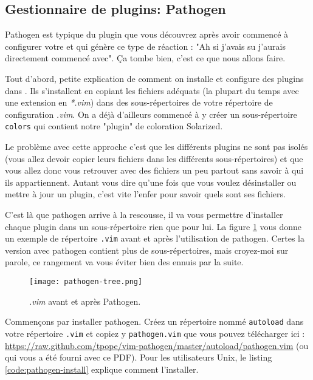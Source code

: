 \subsection{Gestionnaire de plugins: Pathogen}

Pathogen est typique du plugin que vous découvrez après avoir commencé à configurer votre \vim et qui génère ce type de réaction : "Ah si j'avais su j'aurais directement commencé avec". Ça tombe bien, c'est ce que nous allons faire.

Tout d'abord, petite explication de comment on installe et configure des plugins dans \vim. Ils s'installent en copiant les fichiers adéquats (la plupart du temps avec une extension en \emph{*.vim}) dans des sous-répertoires de votre répertoire de configuration \emph{.vim}. On a déjà d'ailleurs commencé à y créer un sous-répertoire \Verb|colors| qui contient notre "plugin" de coloration Solarized.

Le problème avec cette approche c'est que les différents plugins ne sont pas isolés (vous allez devoir copier leurs fichiers dans les différents sous-répertoires) et que vous allez donc vous retrouver avec des fichiers un peu partout sans savoir à qui ils appartiennent. Autant vous dire qu'une fois que vous voulez désinstaller ou mettre à jour un plugin, c'est vite l'enfer pour savoir quels sont ses fichiers.

C'est là que pathogen arrive à la rescousse, il va vous permettre d'installer chaque plugin dans un sous-répertoire rien que pour lui. La figure \ref{fig:pathogen-tree} vous donne un exemple de répertoire \Verb|.vim| avant et après l'utilisation de pathogen. Certes la version avec pathogen contient plus de sous-répertoires, mais croyez-moi sur parole, ce rangement va vous éviter bien des ennuis par la suite.

\begin{figure}%
  \texttt{[image: pathogen-tree.png]}
  \caption{\emph{.vim} avant et après Pathogen.}
  \label{fig:pathogen-tree}
\end{figure}

Commençons par installer pathogen. Créez un répertoire nommé \Verb|autoload| dans votre répertoire \Verb|.vim| et copiez y \Verb|pathogen.vim| que vous pouvez télécharger ici : \url{https://raw.github.com/tpope/vim-pathogen/master/autoload/pathogen.vim} (ou qui vous a été fourni avec ce PDF). Pour les utilisateurs Unix, le listing \ref{code:pathogen-install} explique comment l'installer.

